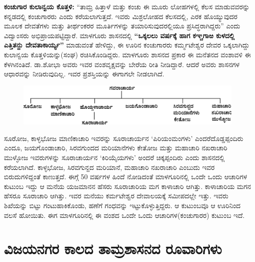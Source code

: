 \textbf{ಕಂಚುಗಾರ ಕುಲಾನ್ವಯ ಕೊತ್ತಳಿ:} “ತಾಮ್ರ ಹಿತ್ತಾಳೆ ಮತ್ತು ಕಂಚು ಈ ಮೂರು ಲೋಹಗಳಲ್ಲಿ ಕೆಲಸ ಮಾಡುವವರನ್ನು ಕನ್ನಡದಲ್ಲಿ ಕಂಚುಗಾರರು ಎಂದು ಕರೆಯಲಾಗುತ್ತದೆ. ಇವರು ಮಿಶ್ರಲೋಹದ ಕೆಲಸದಲ್ಲಿ, ಎರಕ ಹೊಯ್ಯುವುದರ ಮೂಲಕ ದೇವತೆಗಳು ಮತ್ತು ತೀರ್ಥಂಕರರ ಮೂರ್ತಿಗಳನ್ನು ತಯಾರಿಸುವುದರಲ್ಲಿಯೂ ಪ್ರಸಿದ್ಧರಾಗಿದ್ದರು” ಎಂದು ವಿದ್ವಾಂಸರು ಅಭಿಪ್ರಾಯಪಟ್ಟಿದ್ದಾರೆ. ಮಾಳಗೂರು ಶಾಸನದಲ್ಲಿ \textbf{“ಒಕ್ಕಲಲು ವರ್ಷಕ್ಕೆ ಹಾಗ ಕಞ್ಚಗಾಱ ಕುಳದಲ್ಲಿ ಎತ್ತಿತನ್ದು ದೇವತಾಕಾರ್ಯ್ಯ”} ಮಾಡುವಂತೆ ಹೇಳಿದ್ದು, ಈ ಊರಿನ ಕಂಚುಗಾರರು ಕರ್ಮ್ಮಟೇಶ್ವರ ದೇವರ ಒಕ್ಕಲಾಗಿದ್ದು ಕುಲಾನ್ವಯ ಕೊತ್ತಳಿಯನ್ನು(ಸಂಘ) ರಚಿಸಿಕೊಂಡಿದ್ದರು. ಮಾಳಗೂರು ಶಾಸನದ ಪ್ರಕಾರ ಈ ಮನೆತನದ ವಂಶಾವಳಿ ಈ ಕೆಳಗಿನಂತಿದೆ. ಡಾ.ಶೋಭಾ ಅವರು ಇವರ ವಂಶವೃಕ್ಷವನ್ನು ಬೇರೆಯ ರೀತಿ ನೀಡಿದ್ದಾರೆ. ಆದರೆ ಅವರು ಶಾಸನಗಳ ಆಧಾರವನ್ನು ನೀಡಿರುವುದಿಲ್ಲ. ಇವರ ಪ್ರಶಸ್ತಿಯನ್ನು ಈಗಾಗಲೇ ನೀಡಲಾಗಿದೆ.

\begin{figure}[!h]
\includegraphics[scale=.92]{images/chap5/chap5fig4.jpeg}
\end{figure}

ಸೂರೋಜ, ಕಾಳ್ಳಭೋಜ ಮಾಣಿಕಾಚಾರಿ ಇವರನ್ನು ಸೂರಾಚಾರ್ಯನ ‘ಪಿರಿಯಂಮಂಗಳು’ ಎಂದರೆ\break ದೊಡ್ಡಪ್ಪಂದಿರು ಎಂದೂ, ಜಯಗೊಂಡಾಚಾರಿ, ಸಿರವಗುಂದದ ಮರಿಯಾನೆಗಳು ಕೇತೋಜ ಮತ್ತು ಮಹಾಚಾರಿ ನಖರಾಚಾರಿ ಮುಳ್ಳೋಜ ಇವರುಗಳನ್ನು ಸೂರಾಚಾರ್ಯನ ‘ಕಿರಿಯೈಯಗಳು’ ಅಂದರೆ ಚಿಕ್ಕಪ್ಪಂದಿರು ಎಂದು ಶಾಸನದಲ್ಲಿ ಕರೆಯಲಾಗಿದೆ. ಕಾಳ್ಳಭೋಜ, ಸಿರವಗುನ್ದದ ಮರಿಯಾನೆ, ಮಹಾಚಾರಿ ನಖರಾಚಾರಿ ಎಂಬುದು ಇವರ ಬಿರುದುಗಳಿದ್ದಂತೆ ಕಾಣುತ್ತದೆ. ಈಗ್ಗೆ 50 ವರ್ಷಗಳ ಹಿಂದೆ ನೋಡಿದಂತೆ ಮಾಳಗೂರಿನಲ್ಲಿ ಒಂದೇ ಒಂದು ಆಚಾರಿಗಳ ಕುಟುಂಬ ಇದ್ದು ಆ ಮನೆಯ ಯಜಮಾನನ ಹೆಸರು ಸೂರಾಚಾರಿಯ ಮಗ ಕಾಳಾಚಾರಿ ಆಗಿತ್ತು. ಕಾಳಾಚಾರಿಯ ಮಗನ ಹೆಸರೂ ಸೂರಾಚಾರಿ ಆಗಿತ್ತು. ಇವರ ಮನೆಯು ಕರ್ಮಟೇಶ್ವರ ದೇವಾಲಯಕ್ಕೆ ಸಮೀಪದಲ್ಲೇ ಇತ್ತು. ಇವರು ಶಿಖೆಯನ್ನು ಬಿಟ್ಟು ಗಂಟುಹಾಕಿಕೊಂಡು, ಹಣೆಗೆ ಗಂಧವನ್ನು ಇಟ್ಟುಕೊಳ್ಳುತ್ತಿದ್ದರು. ಆ ಕುಟುಂಬವೂ ಆ ಊರಿನಿಂದ ವಲಸೆ ಹೋಯಿತು. ಈಗ ಮಾಳಗೂರಿನಲ್ಲಿ ಈ ವಂಶದ ಒಂದೇ ಒಂದು ಆಚಾರಿಗಳ(ಕಂಚುಗಾರರ) ಕುಟುಂಬ ಇದೆ.


\section{ವಿಜಯನಗರ ಕಾಲದ ತಾಮ್ರಶಾಸನದ ರೂವಾರಿಗಳು}

\vskip -3pt

